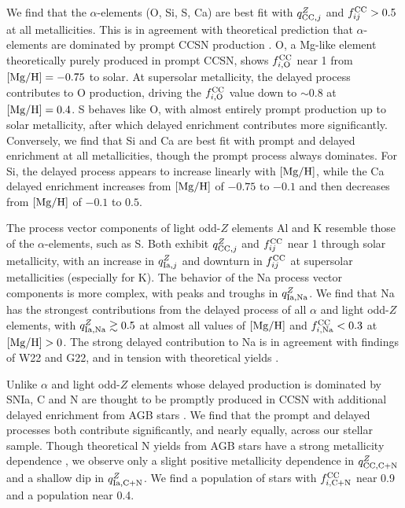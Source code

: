 \documentclass[modern, linenumbers]{aastex631}
\newcommand{\mgh}{[{\rm Mg}/{\rm H}]}
\newcommand{\qcc}{q_{{\rm CC,}j}^{Z}}
\newcommand{\qIa}{q_{{\rm Ia,}j}^{Z}}
\newcommand{\fcc}{f_{ij}^{\rm CC}}
\newcommand{\qccX}[1]{q_{{\rm CC, #1}}^{Z}}
\newcommand{\qIaX}[1]{q_{{\rm Ia, #1}}^{Z}}
\newcommand{\fccX}[1]{f_{i, {\rm #1}}^{\rm CC}}
\begin{document}
We find that the $\alpha$-elements (O, Si, S, Ca) are best fit with $\qcc$ and $\fcc > 0.5$ at all metallicities. This is in agreement with theoretical prediction that $\alpha$-elements are dominated by prompt CCSN production \citep[e.g.][]{andrews2017}. O, a Mg-like element theoretically purely produced in prompt CCSN, shows $\fccX{O}$ near 1 from $\mgh=-0.75$ to solar. At supersolar metallicity, the delayed process contributes to O production, driving the $\fccX{O}$ value down to $\sim 0.8$ at $\mgh=0.4$. S behaves like O, with almost entirely prompt production up to solar metallicity, after which delayed enrichment contributes more significantly. Conversely, we find that Si and Ca are best fit with prompt and delayed enrichment at all metallicities, though the prompt process always dominates. For Si, the delayed process appears to increase linearly with $\mgh$, while the Ca delayed enrichment increases from $\mgh$ of $-0.75$ to $-0.1$ and then decreases from $\mgh$ of $-0.1$ to $0.5$.

The process vector components of light odd-$Z$ elements Al and K resemble those of the $\alpha$-elements, such as S. Both exhibit $\qcc$ and $\fcc$ near 1 through solar metallicity, with an increase in $\qIa$ and downturn in $\fcc$ at supersolar metallicities (especially for K). The behavior of the Na process vector components is more complex, with peaks and troughs in $\qIaX{Na}$. We find that Na has the strongest contributions from the delayed process of all $\alpha$ and light odd-$Z$ elements, with $\qIaX{Na} \gtrsim 0.5$ at almost all values of $\mgh$ and $\fccX{Na} < 0.3$ at $\mgh > 0$. The strong delayed contribution to Na is in agreement with findings of W22 and G22, and in tension with theoretical yields \citep[e.g.][]{andrews2017, rybizki2017}.

Unlike $\alpha$ and light odd-$Z$ elements whose delayed production is dominated by SNIa, C and N are thought to be promptly produced in CCSN with additional delayed enrichment from AGB stars \citep[e.g.][]{andrews2017}. We find that the prompt and delayed processes both contribute significantly, and nearly equally, across our stellar sample. Though theoretical N yields from AGB stars have a strong metallicity dependence \citep{karakas2010, ventura2013, cristallo2015, johnson2022}, we observe only a slight positive metallicity dependence in $\qccX{C+N}$ and a shallow dip in $\qIaX{C+N}$. We find a population of stars with $\fccX{C+N}$ near 0.9 and a population near 0.4. 
\end{document}

